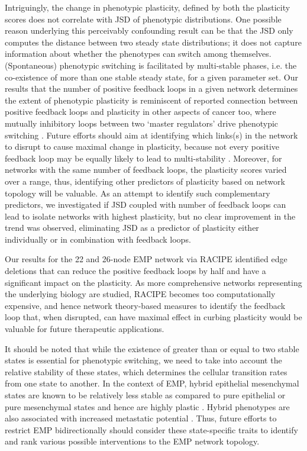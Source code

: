 \documentclass[preprint,review,12pt]{elsarticle}
\begin{document}
	Intriguingly, the change in phenotypic plasticity, defined by both the plasticity scores does not correlate with JSD of phenotypic distributions. One possible reason underlying this perceivably confounding result can be that the JSD only computes the distance between two steady state distributions; it does not capture information about whether the phenotypes can switch among themselves. (Spontaneous) phenotypic switching is facilitated by multi-stable phases, i.e. the co-existence of more than one stable steady state, for a given parameter set. Our results that the number of positive feedback loops in a given network determines the extent of phenotypic plasticity is reminiscent of reported connection between positive feedback loops and plasticity in other aspects of cancer too, where mutually inhibitory loops between two ‘master regulators’ drive phenotypic switching \cite{Huang2014, Jia2018, Jolly2014, Saha2018}. Future efforts should aim at identifying which links(s) in the network to disrupt to cause maximal change in plasticity, because not every positive feedback loop may be equally likely to lead to multi-stability \cite{CHERRY2000, Tiwari2012}. Moreover, for networks with the same number of feedback loops, the plasticity scores varied over a range, thus, identifying other predictors of plasticity based on network topology will be valuable. As an attempt to identify such complementary predictors, we investigated if JSD coupled with number of feedback loops can lead to isolate networks with highest plasticity, but no clear improvement in the trend was observed, eliminating JSD as a predictor of plasticity either individually or in combination with feedback loops.
	
	Our results for the \color {red}22 and \color{black} 26-node EMP network via RACIPE identified edge deletions that can reduce the positive feedback loops by half and have a significant impact on the plasticity. As more comprehensive networks representing the underlying biology are studied, RACIPE becomes too computationally expensive, and hence network theory-based measures to identify the feedback loop that, when disrupted, can have maximal effect in curbing plasticity would be valuable for future therapeutic applications.
	
	\color{red} It should be noted that while the existence of greater than or equal to two stable states is essential for phenotypic switching, we need to take into account the relative stability of these states, which determines the cellular transition rates from one state to another. In the context of EMP, hybrid epithelial mesenchymal states are known to be relatively less stable as compared to pure epithelial or pure mesenchymal states and hence are highly plastic \cite{Pastushenko2019}. Hybrid phenotypes are also associated with increased metastatic potential \cite{Jolly2018, Krger2019}. Thus, future efforts to restrict EMP bidirectionally should consider these state-specific traits to identify and rank various possible interventions to the EMP network topology. \color{black} 
	
\end{document}
